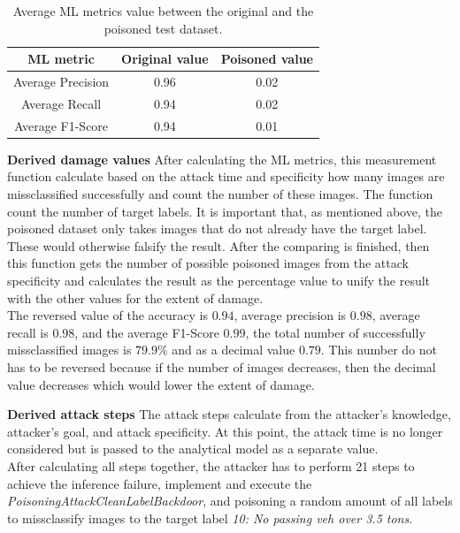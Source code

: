 \begin{table}[ht!]
  \centering
  \begin{tabular}{| c | c | c |}
  \hline
  \rowcolor{lightgray} ML metric & Original value & Poisoned value \\ [0.5ex]
  \hline
  Average Precision & 0.96 & 0.02 \\
  \hline
  Average Recall & 0.94 & 0.02 \\
  \hline
  Average F1-Score & 0.94 & 0.01 \\
  \hline
  \end{tabular}
  \caption{Average ML metrics value between the original and the poisoned test dataset.}
  \label{tab:ml_metrics}
\end{table}

\noindent\textbf{Derived damage values} After calculating the ML metrics, this measurement function calculate based on the attack time and specificity how many images are missclassified successfully and count the number of these images. The function count the number of target labels. It is important that, as mentioned above, the poisoned dataset only takes images that do not already have the target label. These would otherwise falsify the result. After the comparing is finished, then this function gets the number of possible poisoned images from the attack specificity and calculates the result as the percentage value to unify the result with the other values for the extent of damage. \\
The reversed value of the accuracy is $0.94$, average precision is $0.98$, average recall is $0.98$, and the average F1-Score $0.99$, the total number of successfully missclassified images is $79.9\%$ and as a decimal value $0.79$. This number do not has to be reversed because if the number of images decreases, then the decimal value decreases which would lower the extent of damage.

\noindent\textbf{Derived attack steps} The attack steps calculate from the attacker's knowledge, attacker's goal, and attack specificity. At this point, the attack time is no longer considered but is passed to the analytical model as a separate value. \\
After calculating all steps together, the attacker has to perform 21 steps to achieve the inference failure, implement and execute the \textit{PoisoningAttackCleanLabelBackdoor}, and poisoning a random amount of all labels to missclassify images to the target label \textit{10: No passing veh over 3.5 tons}.

